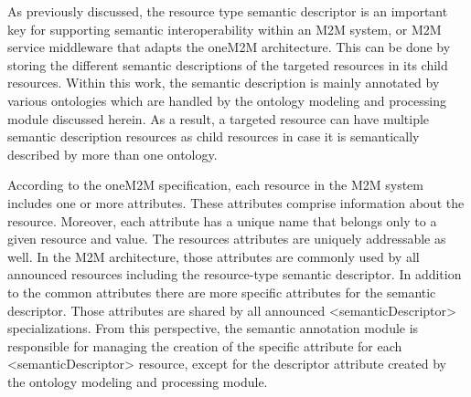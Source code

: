 As previously discussed, the resource type semantic descriptor is an important key for supporting semantic interoperability within an M2M system, or M2M service middleware that adapts the oneM2M architecture. This can be done by storing the different semantic descriptions of the targeted resources in its child resources.
Within this work, the semantic description is mainly annotated by various ontologies which are handled by the ontology modeling and processing module discussed herein. As a result, a targeted resource can have multiple semantic description resources as child resources in case it is semantically described by more than one ontology.\par

According to the oneM2M specification, each resource in the M2M system includes one or more attributes. These attributes comprise information about the resource. Moreover, each attribute has a unique name that belongs only to a given resource and value. The resources attributes are uniquely addressable as well.
In the M2M architecture, those attributes are commonly used by all announced resources including the resource-type semantic descriptor. In addition to the common attributes there are more specific attributes for the semantic descriptor. Those attributes are shared by all announced <semanticDescriptor> specializations. From this perspective, the semantic annotation module is responsible for managing the creation of the specific attribute for each <semanticDescriptor> resource, except for the descriptor attribute created by the ontology modeling and processing module. \par

